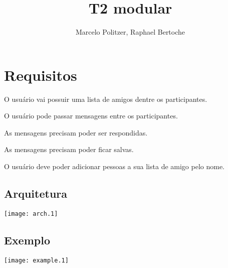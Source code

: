 \documentclass[a4paper,12pt]{article}
\title{T2 modular}
\author{Marcelo Politzer, Raphael Bertoche}
\begin{document}
\maketitle

\section{Requisitos}

\begin{list}{*}{}
\item O usuário vai possuir uma lista de amigos dentre os participantes.
\item O usuário pode passar mensagens entre os participantes.
\item As mensagens precisam poder ser respondidas.
\item As mensagens precisam poder ficar salvas.
\item O usuário deve poder adicionar pessoas a sua lista de amigo pelo nome.
\end{list}

\subsection{Arquitetura}
\texttt{[image: arch.1]}

\subsection{Exemplo}
\texttt{[image: example.1]}
\end{document}
